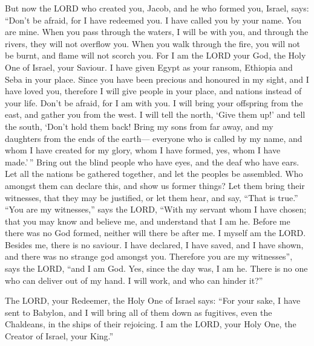  But now the LORD who created you, Jacob, and he who formed
you, Israel, says: ``Don't be afraid, for I have redeemed you. I have
called you by your name. You are mine.  When you pass
through the waters, I will be with you, and through the rivers, they
will not overflow you. When you walk through the fire, you will not be
burnt, and flame will not scorch you.  For I am the LORD
your God, the Holy One of Israel, your Saviour. I have given Egypt as
your ransom, Ethiopia and Seba in your place.  Since you
have been precious and honoured in my sight, and I have loved you,
therefore I will give people in your place, and nations instead of your
life.  Don't be afraid, for I am with you. I will bring your
offspring from the east, and gather you from the west.  I
will tell the north, `Give them up!' and tell the south, `Don't hold
them back! Bring my sons from far away, and my daughters from the ends
of the earth---  everyone who is called by my name, and whom
I have created for my glory, whom I have formed, yes, whom I have
made.'\,''  Bring out the blind people who have eyes, and
the deaf who have ears.  Let all the nations be gathered
together, and let the peoples be assembled. Who amongst them can declare
this, and show us former things? Let them bring their witnesses, that
they may be justified, or let them hear, and say, ``That is true.''
 ``You are my witnesses,'' says the LORD, ``With my servant
whom I have chosen; that you may know and believe me, and understand
that I am he. Before me there was no God formed, neither will there be
after me.  I myself am the LORD. Besides me, there is no
saviour.  I have declared, I have saved, and I have shown,
and there was no strange god amongst you. Therefore you are my
witnesses'', says the LORD, ``and I am God.  Yes, since the
day was, I am he. There is no one who can deliver out of my hand. I will
work, and who can hinder it?''

 The LORD, your Redeemer, the Holy One of Israel says:
``For your sake, I have sent to Babylon, and I will bring all of them
down as fugitives, even the Chaldeans, in the ships of their rejoicing.
 I am the LORD, your Holy One, the Creator of Israel, your
King.''

